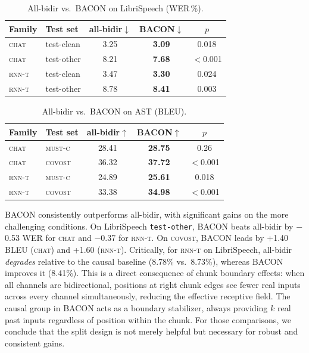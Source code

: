 \documentclass[cameraready]{Interspeech}
\begin{document}
\begin{table}[h]
\centering
\caption{All-bidir vs.\ BACON on LibriSpeech (WER\,\%).}
\label{tab:analysis-zero-vs-split-libri}
\begin{tabular}{llccc}
\toprule
\textbf{Family} & \textbf{Test set} & \textbf{all-bidir}$\downarrow$ & \textbf{BACON}$\downarrow$ & $p$ \\
\midrule
\textsc{chat} & test-clean & 3.25 & \textbf{3.09} & 0.018 \\
\textsc{chat} & test-other & 8.21 & \textbf{7.68} & $<$0.001 \\
\midrule
\textsc{rnn-t} & test-clean & 3.47 & \textbf{3.30} & 0.024 \\
\textsc{rnn-t} & test-other & 8.78 & \textbf{8.41} & 0.003 \\
\bottomrule
\end{tabular}
\end{table}

\begin{table}[h]
\centering
\caption{All-bidir vs.\ BACON on AST (BLEU).}
\label{tab:analysis-zero-vs-split-ast}
\begin{tabular}{llccc}
\toprule
\textbf{Family} & \textbf{Test set} & \textbf{all-bidir}$\uparrow$ & \textbf{BACON}$\uparrow$ & $p$ \\
\midrule
\textsc{chat} & \textsc{must-c} & 28.41 & \textbf{28.75} & 0.26 \\
\textsc{chat} & \textsc{covost} & 36.32 & \textbf{37.72} & $<$0.001 \\
\midrule
\textsc{rnn-t} & \textsc{must-c} & 24.89 & \textbf{25.61} & 0.018 \\
\textsc{rnn-t} & \textsc{covost} & 33.38 & \textbf{34.98} & $<$0.001 \\
\bottomrule
\end{tabular}
\end{table}

BACON consistently outperforms all-bidir, with significant gains on the more
challenging conditions. On LibriSpeech
\texttt{test-other}, BACON beats all-bidir by $-$0.53 WER for \textsc{chat} and
$-$0.37 for \textsc{rnn-t}. On \textsc{covost}, BACON leads by +1.40 BLEU
(\textsc{chat}) and +1.60 (\textsc{rnn-t}).
Critically, for \textsc{rnn-t} on LibriSpeech, all-bidir \emph{degrades} relative
to the causal baseline (8.78\% vs.\ 8.73\%), whereas BACON improves it
(8.41\%). 
This is a direct consequence of chunk boundary effects: when all
channels are bidirectional, positions at right chunk edges see fewer real
inputs across every channel simultaneously, reducing the effective receptive
field. The causal group in BACON acts
as a boundary stabilizer, always providing $k$ real past inputs regardless
of position within the chunk. For those comparisons, we conclude that the split design is
not merely helpful but necessary for robust and consistent gains.
\end{document}
